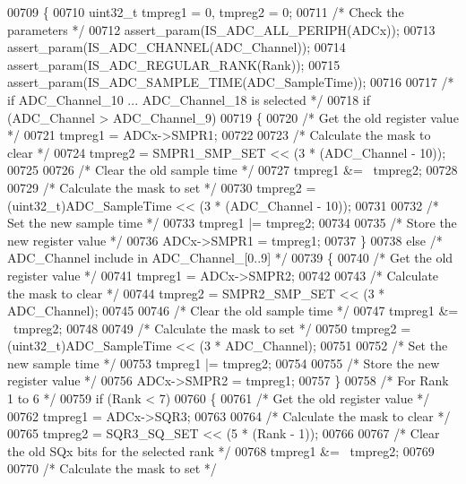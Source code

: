 \begin{DoxyCode}
00709 \{
00710   uint32\_t tmpreg1 = 0, tmpreg2 = 0;
00711   \textcolor{comment}{/* Check the parameters */}
00712   assert_param(IS_ADC_ALL_PERIPH(ADCx));
00713   assert_param(IS_ADC_CHANNEL(ADC\_Channel));
00714   assert_param(IS_ADC_REGULAR_RANK(Rank));
00715   assert_param(IS_ADC_SAMPLE_TIME(ADC\_SampleTime));
00716   
00717   \textcolor{comment}{/* if ADC\_Channel\_10 ... ADC\_Channel\_18 is selected */}
00718   \textcolor{keywordflow}{if} (ADC\_Channel > ADC_Channel_9)
00719   \{
00720     \textcolor{comment}{/* Get the old register value */}
00721     tmpreg1 = ADCx->SMPR1;
00722     
00723     \textcolor{comment}{/* Calculate the mask to clear */}
00724     tmpreg2 = SMPR1_SMP_SET << (3 * (ADC\_Channel - 10));
00725     
00726     \textcolor{comment}{/* Clear the old sample time */}
00727     tmpreg1 &= ~tmpreg2;
00728     
00729     \textcolor{comment}{/* Calculate the mask to set */}
00730     tmpreg2 = (uint32\_t)ADC\_SampleTime << (3 * (ADC\_Channel - 10));
00731     
00732     \textcolor{comment}{/* Set the new sample time */}
00733     tmpreg1 |= tmpreg2;
00734     
00735     \textcolor{comment}{/* Store the new register value */}
00736     ADCx->SMPR1 = tmpreg1;
00737   \}
00738   \textcolor{keywordflow}{else} \textcolor{comment}{/* ADC\_Channel include in ADC\_Channel\_[0..9] */}
00739   \{
00740     \textcolor{comment}{/* Get the old register value */}
00741     tmpreg1 = ADCx->SMPR2;
00742     
00743     \textcolor{comment}{/* Calculate the mask to clear */}
00744     tmpreg2 = SMPR2_SMP_SET << (3 * ADC\_Channel);
00745     
00746     \textcolor{comment}{/* Clear the old sample time */}
00747     tmpreg1 &= ~tmpreg2;
00748     
00749     \textcolor{comment}{/* Calculate the mask to set */}
00750     tmpreg2 = (uint32\_t)ADC\_SampleTime << (3 * ADC\_Channel);
00751     
00752     \textcolor{comment}{/* Set the new sample time */}
00753     tmpreg1 |= tmpreg2;
00754     
00755     \textcolor{comment}{/* Store the new register value */}
00756     ADCx->SMPR2 = tmpreg1;
00757   \}
00758   \textcolor{comment}{/* For Rank 1 to 6 */}
00759   \textcolor{keywordflow}{if} (Rank < 7)
00760   \{
00761     \textcolor{comment}{/* Get the old register value */}
00762     tmpreg1 = ADCx->SQR3;
00763     
00764     \textcolor{comment}{/* Calculate the mask to clear */}
00765     tmpreg2 = SQR3_SQ_SET << (5 * (Rank - 1));
00766     
00767     \textcolor{comment}{/* Clear the old SQx bits for the selected rank */}
00768     tmpreg1 &= ~tmpreg2;
00769     
00770     \textcolor{comment}{/* Calculate the mask to set */}

\end{DoxyCode}
